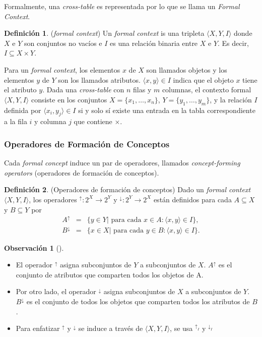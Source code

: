 \documentclass[12pt,oneside,letterpaper]{book}
\newcommand{\eng}[1]{\textit{#1}\xspace}			%
\theoremstyle{definition}
\newtheorem{definition}{Definición}[section]
\newtheorem{remark}{Observación}[section]
\begin{document}
Formalmente, una \eng{cross-table} es representada por lo que se llama un \eng{Formal Context}.

\theoremstyle{definition}
\begin{definition}{(\eng{formal context})}
Un \eng{formal context} is una tripleta $\langle X,Y,I \rangle$ donde $X$ e $Y$ son conjuntos no vacíos e $I$ es una relación binaria entre $X$ e $Y$. Es decir, $I \subseteq X \times Y$.
\end{definition}

Para un \eng{formal context}, los elementos $x$ de $X$ son llamados objetos y los elementos $y$ de $Y$ son los llamados atributos. $\langle x,y \rangle \in I$ indica que el objeto $x$ tiene el atributo $y$. Dada una \eng{cross-table} con $n$ filas y $m$ columnas, el contexto formal $\langle X,Y,I \rangle$ consiste en los conjuntos $X = \{x_1,\dots,x_n\}$, $Y = \{y_1,\dots,y_m\}$, y la relación $I$ definida por $\langle x_i,y_j \rangle \in I$ si y solo sí existe una entrada en la tabla correspondiente a la fila $i$ y columna $j$ que contiene $\times$. 

\subsubsection{Operadores de Formación de Conceptos}
\label{ssub:operadores_de_formacion_de_conceptos}
Cada \eng{formal concept} induce un par de operadores, llamados \eng{concept-forming operators} (operadores de formación de conceptos). 

\begin{definition}{(Operadores de formación de conceptos)}
Dado un \eng{formal context} $\langle X,Y,I \rangle$, los operadores $^{\uparrow}: 2^X \rightarrow 2^Y$ y $^{\downarrow}: 2^Y \rightarrow 2^X$ están definidos para cada $A \subseteq X$ y $B \subseteq Y$ por
\begin{eqnarray}
	A^{\uparrow} 	&=& \{y \in Y|\text{ para cada } x \in A: \langle x,y \rangle \in I\}, \nonumber \\
	B^{\downarrow} 	&=& \{x \in X|\text{ para cada } y \in B: \langle x,y \rangle \in I\}. \nonumber
\end{eqnarray}
\end{definition}

\begin{remark}[]
\begin{itemize}
	\item El operador $^{\uparrow}$ asigna subconjuntos de $Y$ a subconjuntos de $X$. $A^{\uparrow}$ es el conjunto de atributos que comparten todos los objetos de A.
	\item Por otro lado, el operador $^{\downarrow}$ asigna subconjuntos de $X$ a subconjuntos de $Y$. $B^{\downarrow}$ es el conjunto de todos los objetos que comparten todos los atributos de $B$.
	\item Para enfatizar $^{\uparrow}$ y $^{\downarrow}$ se induce a través de $\langle X,Y,I \rangle$, se usa $^{\uparrow_I}$ y $^{\downarrow_I}$
\end{itemize}
\end{remark}
\end{document}
